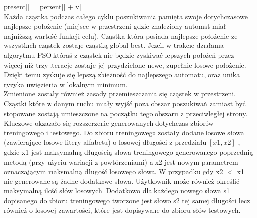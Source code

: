 \documentclass[runningheads,a4paper]{llncs}
\begin{document}
present[] = persent[] + v[] \\

Każda cząstka podczas całego cyklu poszukiwania pamięta swoje dotychczasowe najlepsze położenie (miejsce w przestrzeni gdzie znaleziony automat miał najniższą wartość funkcji celu). Cząstka która posiada najlepsze położenie ze wszystkich cząstek zostaje cząstką global best. Jeżeli w trakcie działania algorytmu PSO któraś z cząstek nie będzie zyskiwać lepszych położeń przez więcej niż trzy iteracje zostaje jej przydzielone nowe, zupełnie losowe położenie. Dzięki temu zyskuje się lepszą zbieżność do najlepszego automatu, oraz unika ryzyka uwięzienia w lokalnym minimum. \\

Zmienione zostały również zasady przemieszczania się cząstek w przestrzeni. Cząstki które w danym ruchu miały wyjść poza obszar poszukiwań zamiast być stopowane zostają umieszczone na początku tego obszaru z przeciwległej strony. \\

Kluczowe okzazało się rozszerzenie generowanych dotychczas zbiorów - treningowego i testowego. Do zbioru treningowego zostały dodane losowe słowa (zawierające losowe litery alfabetu) o losowej długości z przedziału $[x1,x2]$ , gdzie x1 jest maksymalną długością słowa treningowego generowanego poprzednią metodą (przy użyciu wariacji z powtórzeniami) a x2 jest nowym parametrem oznaczającym maksmalną długość losowego słowa. W przypadku gdy x2 $<$ x1 nie generowane są żadne dodatkowe słowa. Użytkownik może również określić maksymalną ilość słów losowych. Dodatkowo dla każdego nowego słowa s1 dopisanego do zbioru treningowego tworzone jest słowo s2 tej samej długości lecz również o losowej zawartości, które jest dopisywane do zbioru słów testowych. \\
\end{document}
